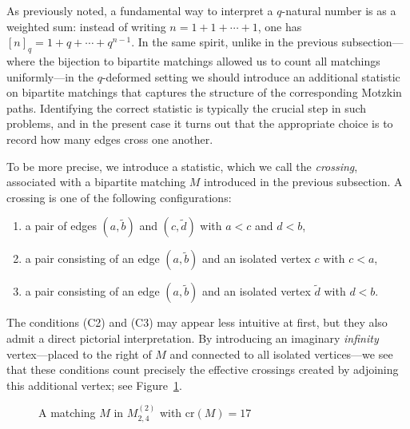 \documentclass{amsart}
\newcommand{\Cr}{\mathrm{cr}}
\theoremstyle{plain}
\theoremstyle{remark}
\numberwithin{equation}{section}
\begin{document}
As previously noted, a fundamental way to interpret a $q$-natural number is as a weighted sum:  
instead of writing $n = 1 + 1 + \cdots + 1$, one has $[n]_{q} = 1 + q + \cdots + q^{n-1}$.  
In the same spirit, unlike in the previous subsection—where the bijection to bipartite matchings allowed us to count all matchings uniformly—in the $q$-deformed setting we should introduce an additional statistic on bipartite matchings that captures the structure of the corresponding Motzkin paths. Identifying the correct statistic is typically the crucial step in such problems, and in the present case it turns out that the appropriate choice is to record how many edges cross one another.

To be more precise, we introduce a statistic, which we call the \textit{crossing}, associated with a bipartite matching $M$ introduced in the previous subsection. A crossing is one of the following configurations:
\begin{enumerate}
    \item[(C1)] a pair of edges $(a,\widetilde{b})$ and $(c,\widetilde{d})$ with $a<c$ and $d<b$,  
    \smallskip
    \item[(C2)] a pair consisting of an edge $(a,\widetilde{b})$ and an isolated vertex $c$ with $c<a$,  
    \smallskip
    \item[(C3)] a pair consisting of an edge $(a,\widetilde{b})$ and an isolated vertex $\widetilde{d}$ with $d<b$.
\end{enumerate}
The conditions \textup{(C2)} and \textup{(C3)} may appear less intuitive at first, but they also admit a direct pictorial interpretation.  
By introducing an imaginary \emph{infinity} vertex—placed to the right of $M$ and connected to all isolated vertices—we see that these conditions count precisely the effective crossings created by adjoining this additional vertex; see Figure~\ref{Fig_crossing def}.

\begin{figure}[h]
    \centering
    \caption{A matching $M$ in $M_{2,4}^{(2)}$ with $\Cr(M)=17$}
    \label{Fig_crossing def}
\end{figure}
\end{document}
